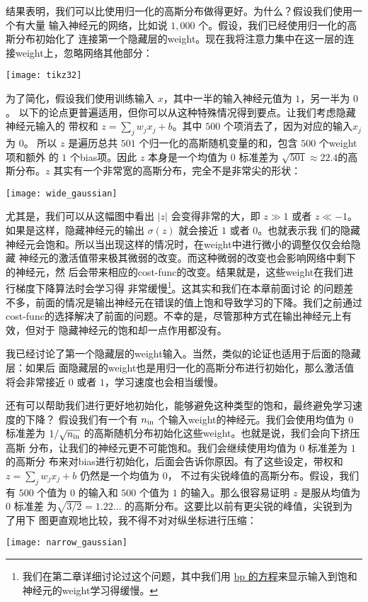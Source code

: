 结果表明，我们可以比使用归一化的高斯分布做得更好。为什么？假设我们使用一个有大量
输入神经元的网络，比如说 $1,000$ 个。假设，我们已经使用归一化的高斯分布初始化了
连接第一个隐藏层的\gls*{weight}。现在我将注意力集中在这一层的连接\gls*{weight}上，忽略网络其他部分：
\begin{center}
  \texttt{[image: tikz32]}
\end{center}

为了简化，假设我们使用训练输入 $x$，其中一半的输入神经元值为 $1$，另一半为 $0$。
以下的论点更普遍适用，但你可以从这种特殊情况得到要点。让我们考虑隐藏神经元输入的
带权和 $z=\sum_j w_j x_j + b$。其中 $500$ 个项消去了，因为对应的输入$x_j$ 为 $0$。
所以 $z$ 是遍历总共 $501$ 个归一化的高斯随机变量的和，包含 $500$ 个\gls*{weight}项和额外
的 $1$ 个\gls*{bias}项。因此 $z$ 本身是一个均值为 $0$ 标准差为 $\sqrt{501} \approx
22.4$的高斯分布。$z$ 其实有一个非常宽的高斯分布，完全不是非常尖的形状：
\begin{center}
  \texttt{[image: wide\_gaussian]}
\end{center}

尤其是，我们可以从这幅图中看出 $|z|$ 会变得非常的大，即 $z \gg 1$ 或者 $z \ll
-1$。如果是这样，隐藏神经元的输出 $\sigma(z)$ 就会接近 $1$ 或者 $0$。也就表示我
们的隐藏神经元会饱和。所以当出现这样的情况时，在\gls*{weight}中进行微小的调整仅仅会给隐藏
神经元的激活值带来极其微弱的改变。而这种微弱的改变也会影响网络中剩下的神经元，然
后会带来相应的\gls*{cost-func}的改变。结果就是，这些\gls*{weight}在我们进行梯度下降算法时会学习得
非常缓慢\footnote{我们在第二章详细讨论过这个问题，其中我们用%
  \hyperref[sec:the_four_fundamental_equations_behind_backpropagation]{\gls*{bp}
    的方程}来显示输入到饱和神经元的\gls*{weight}学习得缓慢。}。这其实和我们在本章前面讨论
的问题差不多，前面的情况是输出神经元在错误的值上饱和导致学习的下降。我们之前通过
\gls*{cost-func}的选择解决了前面的问题。不幸的是，尽管那种方式在输出神经元上有效，但对于
隐藏神经元的饱和却一点作用都没有。

我已经讨论了第一个隐藏层的\gls*{weight}输入。当然，类似的论证也适用于后面的隐藏层：如果后
面隐藏层的\gls*{weight}也是用归一化的高斯分布进行初始化，那么激活值将会非常接近 $0$ 或者
$1$，学习速度也会相当缓慢。

还有可以帮助我们进行更好地初始化，能够避免这种类型的饱和，最终避免学习速度的下降？
假设我们有一个有 $n_{\rm in}$ 个输入\gls*{weight}的神经元。我们会使用均值为 $0$ 标准差为
$1/\sqrt{n_{\rm in}}$ 的高斯随机分布初始化这些\gls*{weight}。也就是说，我们会向下挤压高斯
分布，让我们的神经元更不可能饱和。我们会继续使用均值为 $0$ 标准差为 $1$ 的高斯分
布来对\gls*{bias}进行初始化，后面会告诉你原因。有了这些设定，带权和 $z = \sum_j w_j x_j
+ b$ 仍然是一个均值为 $0$， 不过有尖锐峰值的高斯分布。假设，我们有 $500$ 个值为
$0$ 的输入和 $500$ 个值为 $1$ 的输入。那么很容易证明 $z$ 是服从均值为 $0$ 标准差
为$\sqrt{3/2} = 1.22\ldots$ 的高斯分布。这要比以前有更尖锐的峰值，尖锐到为了用下
图更直观地比较，我不得不对对纵坐标进行压缩：
\begin{center}
  \texttt{[image: narrow\_gaussian]}
\end{center}

